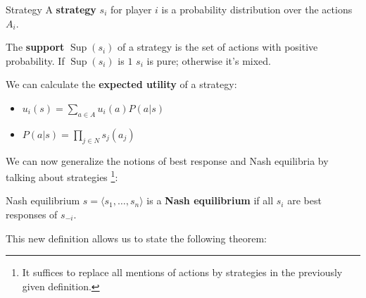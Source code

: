 \documentclass{tufte-handout}
\begin{document}
\begin{definition}{Strategy}\label{strategy}
  A \textbf{strategy} $s_i$ for player $i$ is a probability distribution
  over the actions $A_i$.

  The \textbf{support} $\operatorname{Sup}(s_i)$ of a strategy
  is the set of actions with positive probability.
  If $\operatorname{Sup}(s_i)$ is $1$ $s_i$ is pure;
  otherwise it's mixed.
\end{definition}

We can calculate the \textbf{expected utility} of a strategy:

\begin{itemize}
  \item $u_i(s) = \sum_{a \in A} u_i(a)P(a|s)$
  \item $P(a|s) = \prod_{j \in N} s_j(a_j)$
\end{itemize}

We can now generalize the notions of best response and Nash equilibria by
talking about strategies
\footnote{It suffices to replace all mentions of actions by strategies
in the previously given definition.}:

\begin{definition}{Nash equilibrium}
$s = \langle s_1, \dots, s_n \rangle$ is a
\textbf{Nash equilibrium} if all $s_i$ are best responses of $s_{-i}$.
\end{definition}

This new definition allows us to state the following theorem:
\end{document}
